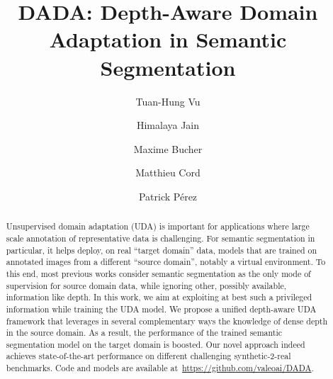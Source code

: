 \documentclass[10pt,twocolumn,letterpaper]{article}
\begin{document}
	
\title{DADA: Depth-Aware Domain Adaptation in Semantic Segmentation}
	\makeatletter
	\renewcommand\AB@affilsepx{\qquad\qquad \protect\Affilfont}
	\makeatother
	\author[1]{Tuan-Hung Vu}
	\author[1]{Himalaya Jain}
	\author[1]{Maxime Bucher}
	\author[1,2]{Matthieu Cord}
	\author[1]{Patrick P\'erez}
	
	
\begin{abstract}
		\vspace{-0.5cm}
		Unsupervised domain adaptation (UDA) is important for applications where large scale annotation of representative data is challenging. For semantic segmentation in particular, it helps deploy, on real ``target domain'' data, models that are trained on annotated images from a different ``source domain'', notably a virtual environment.
		To this end, most previous works consider semantic segmentation as the only mode of supervision for source domain data, while ignoring other, possibly available, information like depth.
		In this work, we aim at exploiting at best such a privileged information while training the UDA model.
		We propose a unified depth-aware UDA framework that leverages in several complementary ways the knowledge of dense depth in the source domain.  
		As a result, the performance of the trained semantic segmentation model on the target domain is boosted. Our novel approach indeed achieves state-of-the-art performance on different challenging synthetic-2-real benchmarks. Code and models are available at~\url{https://github.com/valeoai/DADA}.
	\end{abstract}
	
\end{document}
